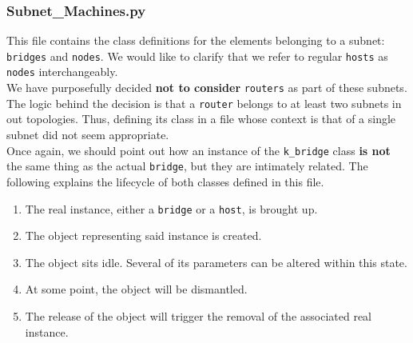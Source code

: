 \subsubsection{Subnet\_Machines.py}
    This file contains the class definitions for the elements belonging to a subnet: \texttt{bridges} and \texttt{nodes}. We would like to clarify that we refer to regular \texttt{hosts} as \texttt{nodes} interchangeably.\\

    We have purposefully decided \textbf{not to consider} \texttt{routers} as part of these subnets. The logic behind the decision is that a \texttt{router} belongs to at least two subnets in out topologies. Thus, defining its class in a file whose context is that of a single subnet did not seem appropriate.\\

    Once again, we should point out how an instance of the \texttt{k\_bridge} class \textbf{is not} the same thing as the actual \texttt{bridge}, but they are intimately related. The following explains the lifecycle of both classes defined in this file.\\

    \begin{enumerate}
        \item The real instance, either a \texttt{bridge} or a \texttt{host}, is brought up.
        \item The object representing said instance is created.
        \item The object sits idle. Several of its parameters can be altered within this state.
        \item At some point, the object will be dismantled.
        \item The release of the object will trigger the removal of the associated real instance.
    \end{enumerate}

